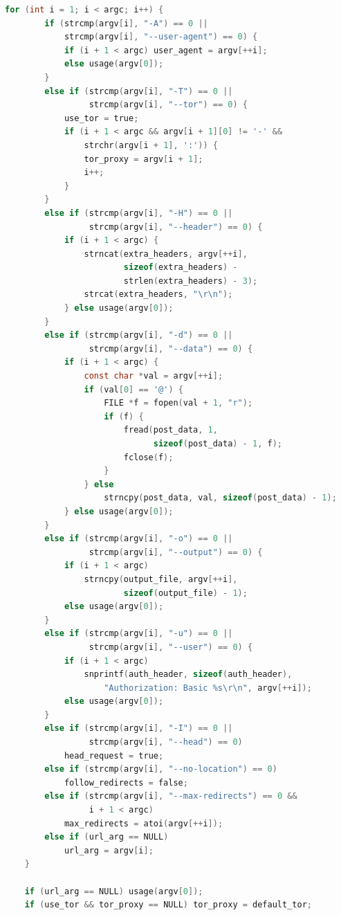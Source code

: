 \begin{lstlisting}[style=oldcode,language=C,firstnumber=1]
    for (int i = 1; i < argc; i++) {
        if (strcmp(argv[i], "-A") == 0 ||
            strcmp(argv[i], "--user-agent") == 0) {
            if (i + 1 < argc) user_agent = argv[++i];
            else usage(argv[0]);
        }
        else if (strcmp(argv[i], "-T") == 0 ||
                 strcmp(argv[i], "--tor") == 0) {
            use_tor = true;
            if (i + 1 < argc && argv[i + 1][0] != '-' &&
                strchr(argv[i + 1], ':')) {
                tor_proxy = argv[i + 1];
                i++;
            }
        }
        else if (strcmp(argv[i], "-H") == 0 ||
                 strcmp(argv[i], "--header") == 0) {
            if (i + 1 < argc) {
                strncat(extra_headers, argv[++i],
                        sizeof(extra_headers) -
                        strlen(extra_headers) - 3);
                strcat(extra_headers, "\r\n");
            } else usage(argv[0]);
        }
        else if (strcmp(argv[i], "-d") == 0 ||
                 strcmp(argv[i], "--data") == 0) {
            if (i + 1 < argc) {
                const char *val = argv[++i];
                if (val[0] == '@') {
                    FILE *f = fopen(val + 1, "r");
                    if (f) {
                        fread(post_data, 1,
                              sizeof(post_data) - 1, f);
                        fclose(f);
                    }
                } else
                    strncpy(post_data, val, sizeof(post_data) - 1);
            } else usage(argv[0]);
        }
        else if (strcmp(argv[i], "-o") == 0 ||
                 strcmp(argv[i], "--output") == 0) {
            if (i + 1 < argc)
                strncpy(output_file, argv[++i],
                        sizeof(output_file) - 1);
            else usage(argv[0]);
        }
        else if (strcmp(argv[i], "-u") == 0 ||
                 strcmp(argv[i], "--user") == 0) {
            if (i + 1 < argc)
                snprintf(auth_header, sizeof(auth_header),
                    "Authorization: Basic %s\r\n", argv[++i]);
            else usage(argv[0]);
        }
        else if (strcmp(argv[i], "-I") == 0 ||
                 strcmp(argv[i], "--head") == 0)
            head_request = true;
        else if (strcmp(argv[i], "--no-location") == 0)
            follow_redirects = false;
        else if (strcmp(argv[i], "--max-redirects") == 0 &&
                 i + 1 < argc)
            max_redirects = atoi(argv[++i]);
        else if (url_arg == NULL)
            url_arg = argv[i];
    }

    if (url_arg == NULL) usage(argv[0]);
    if (use_tor && tor_proxy == NULL) tor_proxy = default_tor;
\end{lstlisting}
